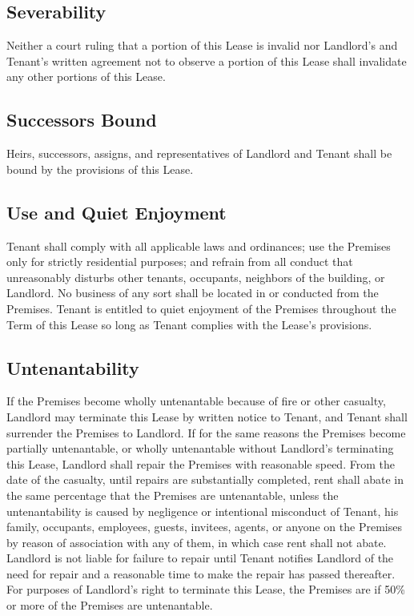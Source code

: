 \documentclass{article}
\begin{document}
\subsection{Severability}
Neither a court ruling that a portion of this Lease is invalid nor Landlord’s
and Tenant’s written agreement not to observe a portion of this Lease shall
invalidate any other portions of this Lease.

\subsection{Successors Bound}
Heirs, successors, assigns, and representatives of Landlord and Tenant shall be
bound by the provisions of this Lease.

\subsection{Use and Quiet Enjoyment}
Tenant shall comply with all applicable laws and ordinances; use the Premises
only for strictly residential purposes; and refrain from all conduct that
unreasonably disturbs other tenants, occupants, neighbors of the building, or
Landlord. No business of any sort shall be located in or conducted from the
Premises. Tenant is entitled to quiet enjoyment of the Premises throughout the
Term of this Lease so long as Tenant complies with the Lease’s provisions.

\subsection{Untenantability}
If the Premises become wholly untenantable because of fire or other casualty,
Landlord may terminate this Lease by written notice to Tenant, and Tenant shall
surrender the Premises to Landlord. If for the same reasons the Premises become
partially untenantable, or wholly untenantable without Landlord’s terminating
this Lease, Landlord shall repair the Premises with reasonable speed. From the
date of the casualty, until repairs are substantially completed, rent shall
abate in the same percentage that the Premises are untenantable, unless the
untenantability is caused by negligence or intentional misconduct of Tenant, his
family, occupants, employees, guests, invitees, agents, or anyone on the Premises
by reason of association with any of them, in which case rent shall not abate.
Landlord is not liable for failure to repair until Tenant notifies Landlord of
the need for repair and a reasonable time to make the repair has passed
thereafter. For purposes of Landlord’s right to terminate this Lease, the
Premises are  if 50\% or more of the
Premises are untenantable.
\end{document}
